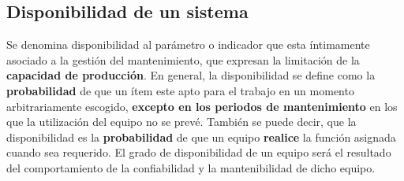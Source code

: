 \documentclass[
	12pt, %
	fleqn, %
	a4paper, %
	oneside, %
]{LegrandOrangeBook}
\begin{document}
\subsection{Disponibilidad de un sistema}
Se denomina disponibilidad al parámetro o indicador que esta íntimamente asociado a la gestión del mantenimiento, que expresan la limitación de la \textbf{capacidad de producción}. En general, la disponibilidad se define como la \textbf{probabilidad} de que un ítem este apto para el trabajo en un momento arbitrariamente escogido, \textbf{excepto en los periodos de mantenimiento} en los que la utilización del equipo no se prevé. También se puede decir, que la disponibilidad es la \textbf{probabilidad} de que un equipo \textbf{realice} la función asignada cuando sea requerido. El grado de disponibilidad de un equipo será el resultado del comportamiento de la confiabilidad y la mantenibilidad de dicho equipo.
\end{document}
